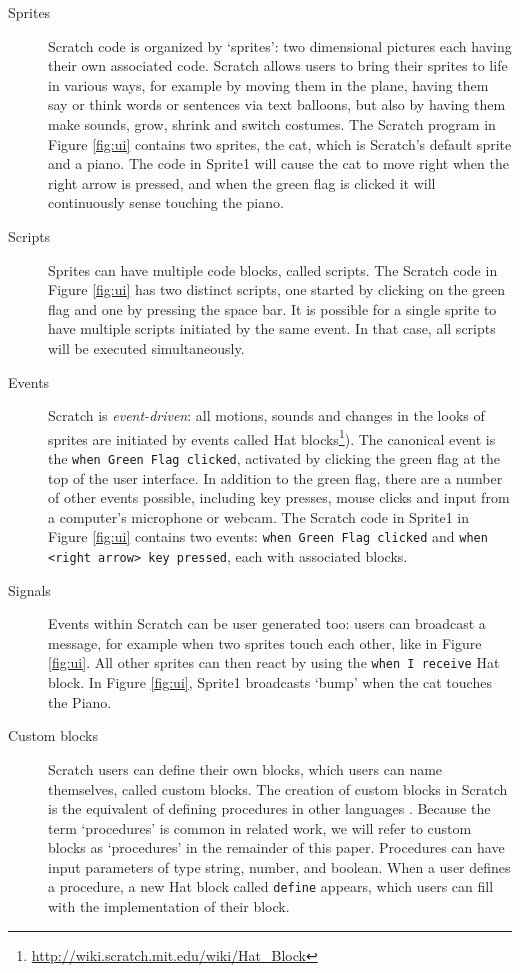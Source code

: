 \documentclass{sig-alternate}
\begin{document}
\begin{description}
	\item [Sprites] Scratch code is organized by `sprites': two dimensional pictures each having their own associated code. Scratch allows users to bring their sprites to life in various ways, for example by moving them in the plane, having them say or think words or sentences via text balloons, but also by having them make sounds, grow, shrink and switch costumes. The Scratch program in Figure \ref{fig:ui} contains two sprites, the cat, which is Scratch's default sprite and a piano. The code in Sprite1 will cause the cat to move right when the right arrow is pressed, and when the green flag is clicked it will continuously sense touching the piano.
	\item [Scripts]Sprites can have multiple code blocks, called scripts. The Scratch code in Figure \ref{fig:ui} has two distinct scripts, one started by clicking on the green flag and one by pressing the space bar. It is possible for a single sprite to have multiple scripts initiated by the same event. In that case, all scripts will be executed simultaneously.
	\item [Events] Scratch is \emph{event-driven}: all motions, sounds and changes in the looks of sprites are initiated by events called Hat blocks\footnote{\url{http://wiki.scratch.mit.edu/wiki/Hat_Block}}). The canonical event is the \texttt{when Green Flag clicked}, activated by clicking the green flag at the top of the user interface. In addition to the green flag, there are a number of other events possible, including key presses, mouse clicks and input from a computer's microphone or webcam. The Scratch code in Sprite1 in Figure \ref{fig:ui} contains two events: \texttt{when Green Flag clicked} and \texttt{when <right arrow> key pressed}, each with associated blocks.
	\item [Signals] Events within Scratch can be user generated too: users can broadcast a message, for example when two sprites touch each other, like in Figure \ref{fig:ui}. All other sprites can then react by using the \texttt{when I receive} Hat block. In Figure \ref{fig:ui}, Sprite1 broadcasts `bump' when the cat touches the Piano. 
	\item[Custom blocks] Scratch users can define their own blocks, which users can name themselves, called custom blocks. The creation of custom blocks in Scratch is the equivalent of defining procedures in other languages \cite{moreno_automatic_2014}. Because the term `procedures' is common in related work, we will refer to custom blocks as `procedures' in the remainder of this paper. Procedures can have input parameters of type string, number, and boolean. When a user defines a procedure, a new Hat block called \texttt{define} appears, which users can fill with the implementation of their block.
\end{description}
\end{document}
